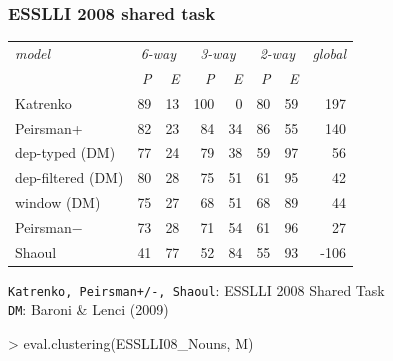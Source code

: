 \documentclass[t]{beamer} %
\begin{document}
\begin{frame}[fragile]
  \frametitle{ESSLLI 2008 shared task}

  \ungap[1]
  \begin{center}\small
    \begin{tabular}{|l|r|r||r|r||r|r||r|}
      \hline
      \emph{model} &\multicolumn{2}{|c||}{\emph{6-way}} &  \multicolumn{2}{|c||}{\emph{3-way}} & \multicolumn{2}{|c||}{\emph{2-way}}&  \multicolumn{1}{|c|}{\emph{global}}\\
      \cline{2-7}
                   &   \emph{P} & \emph{E}  & \emph{P} & \emph{E}  & \emph{P} & \emph{E} &\\
      \hline
      \hline
      Katrenko & 89 & 13 & 100 & 0 & 80 & 59 & 197\\ 
      \hline
      Peirsman+ & 82 & 23 & 84 & 34 & 86 & 55 & 140\\
      \hline
      dep-typed (DM) & 77 & 24 & 79 & 38 & 59 & 97 & 56\\
      \hline
      dep-filtered (DM) & 80 &28 & 75& 51& 61& 95 & 42\\
      \hline
      window (DM) & 75& 27&  68& 51& 68& 89   &44\\
      \hline
      Peirsman$-$ & 73 & 28 & 71 & 54 & 61 & 96 & 27\\
      \hline
      Shaoul & 41& 77& 52& 84 & 55& 93& -106\\
      \hline
    \end{tabular}
  \end{center}

  \begin{center}\footnotesize
    {\tt Katrenko, Peirsman+/-, Shaoul}: ESSLLI 2008 Shared Task\\
    {\tt DM}: Baroni \& Lenci (2009)
  \end{center}

\begin{Rcode}
> eval.clustering(ESSLLI08_Nouns, M) 
\end{Rcode}
\end{frame}
\end{document}
